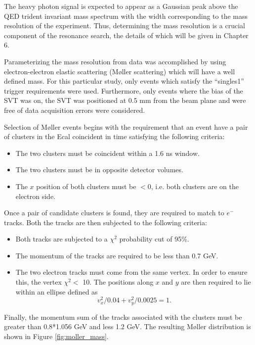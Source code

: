 The heavy photon signal is expected to appear as a Gaussian peak above the QED 
trident invariant mass spectrum with the width corresponding to the mass 
resolution of the experiment.  Thus, determining the mass resolution is a crucial
component of the resonance search, the details of which will be given in Chapter 6.

Parameterizing the mass resolution from data was accomplished by using electron-electron
elastic scattering (M\o ller scattering) which will have a well defined mass.
For this particular study, only events which satisfy the ``singles1'' trigger 
requirements were used.  Furthermore, only events where the bias of the SVT was 
on, the SVT was positioned at 0.5 mm from the beam plane and were free of 
data acquisition errors were considered.

Selection of M\o ller events begins with the requirement that an event have a
pair of clusters in the Ecal coincident in time satisfying the following criteria:
\begin{itemize}
    \item The two clusters must be coincident within a 1.6 ns window.
    \item The two clusters must be in opposite detector volumes.
    \item The $x$ position of both clusters must be $<0$, i.e. both clusters
          are on the electron side.
\end{itemize}
Once a pair of candidate clusters is found, they are required to match to 
$e^-$ tracks.  Both the tracks are then subjected to the following criteria:
\begin{itemize}
    \item Both tracks are subjected to a $\chi^{2}$ probability cut of 95\%.
    \item The momentum of the tracks are required to be less than 0.7 GeV.
    \item The two electron tracks must come from the same vertex.  In order to
          ensure this, the vertex $\chi^2 <$ 10. The positions along $x$ and $y$
          are then required to lie within an ellipse defined as
          \[
                v_x^2/0.04 + v_y^2/0.0025  = 1.
          \]
\end{itemize}
Finally, the momentum sum of the tracks associated with the clusters must be
greater than 0.8*1.056 GeV and less 1.2 GeV.  The resulting M\o ller distribution
is shown in Figure \ref{fig:moller_mass}. 

